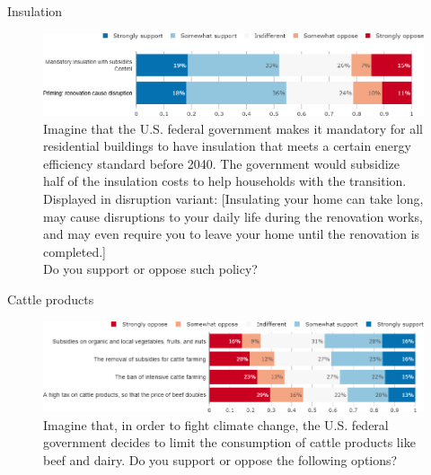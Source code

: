 \documentclass[aspectratio=169,9pt,dvipsnames]{beamer}
\begin{document}
\begin{frame}{Insulation}%
\vspace{-.5cm}
\begin{figure}[h!]
\caption{Imagine that the U.S. federal government makes it mandatory for all residential buildings to have insulation that meets a certain energy efficiency standard before 2040. The government would subsidize half of the insulation costs to help households with the transition. \\
Displayed in disruption variant: [Insulating your home can take long, may cause disruptions to your daily life during the renovation works, and may even require you to leave your home until the renovation is completed.]  \\
Do you support or oppose such policy? }
\includegraphics[width=.9\textwidth]{../figures/US/insulation_support_variant_US.png} 
\end{figure}
\end{frame}

\begin{frame}{Cattle products}%
\vspace{-.5cm}
\begin{figure}[h!]
\caption{Imagine that, in order to fight climate change, the U.S. federal government decides to limit the consumption of cattle products like beef and dairy.
Do you support or oppose the following options?}
\includegraphics[width=1\textwidth]{../figures/US/beef_US.png} 
\end{figure}
\end{frame}
\end{document}
